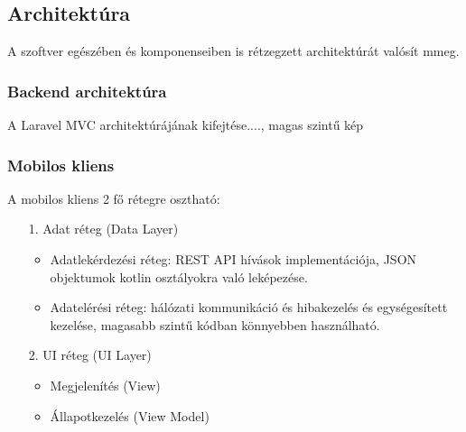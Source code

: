 \subsection{Architektúra}

A szoftver egészében és komponenseiben is rétzegzett architektúrát valósít mmeg.

\subsubsection{Backend architektúra}

A Laravel MVC architektúrájának kifejtése...., magas szintű kép


\subsubsection{Mobilos kliens}

A mobilos kliens 2 fő rétegre osztható:

\begin{itemize}
    \item  [1.] Adat réteg (Data Layer)
    \begin{itemize}
        \item Adatlekérdezési réteg: REST API hívások implementációja, JSON objektumok kotlin osztályokra való leképezése.
        \item Adatelérési réteg: hálózati kommunikáció és hibakezelés és egységesített kezelése, magasabb szintű kódban könnyebben használható.
    \end{itemize}
    \item  [2.] UI réteg (UI Layer)
    \begin{itemize}
        \item  Megjelenítés (View)
        \item  Állapotkezelés (View Model)
    \end{itemize}
\end{itemize}